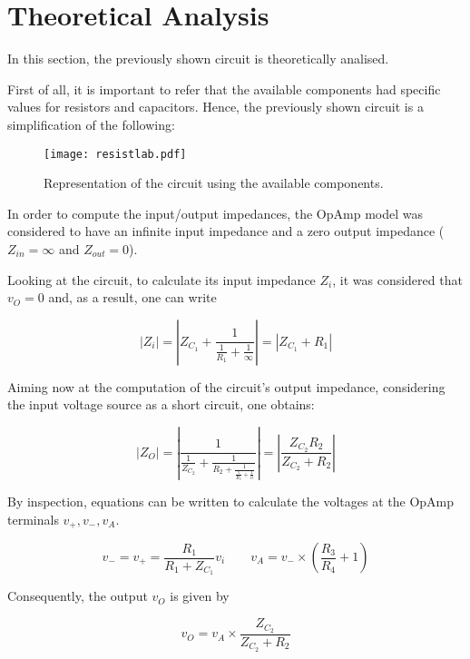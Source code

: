 
\section{Theoretical Analysis}
\label{sec:analysis}
\vspace{3mm}
\par In this section, the previously shown circuit is theoretically analised.
\vspace{3mm}
\par First of all, it is important to refer that the available components had specific values for resistors and capacitors. Hence, the previously shown circuit is a simplification of the following:

\newpage

\begin{figure}[h] \centering
\texttt{[image: resistlab.pdf]}
\caption{Representation of the circuit using the available components.}
\label{fig_circ2}
\end{figure}


In order to compute the input/output impedances, the OpAmp model was considered to have an infinite input impedance and a zero output impedance ($Z_{in}=\infty$ and $Z_{out}=0$).\par
Looking at the circuit, to calculate its input impedance $Z_i$, it was considered that $v_O=0$ and, as a result, one can write

\begin{equation}
  |Z_i| = \left| Z_{C_{1}}+\frac{1}{\frac{1}{R_1}+\frac{1}{\infty}}\right|=| Z_{C_{1}}+R_1|
\end{equation}


Aiming now at the computation of the circuit's output impedance, considering the input voltage source as a short circuit, one obtains:

\begin{equation}
  |Z_O|=\left|\frac{1}{\frac{1}{Z_{C_2}}+\frac{1}{R_2+   \frac{1}{\frac{1}{R_3}+\frac{1}{0} }}}\right| = \left|\frac{Z_{C_{2}}R_2}{Z_{C_{2}}+R_2}\right|
\end{equation}

By inspection, equations can be written to calculate the voltages at the OpAmp terminals $v_{+},v_-,v_A$.

\begin{equation}
  v_-=v_+=\frac{R_1}{R_1+Z_{C_{1}}}v_i  \quad  \quad  v_A=v_-\times\left(\frac{R_3}{R_4}+1\right)
\end{equation}

Consequently, the output $v_O$ is given by

\begin{equation}
  v_O=v_A\times \frac{Z_{C_{2}}}{Z_{C_{2}}+R_2}
\end{equation}

